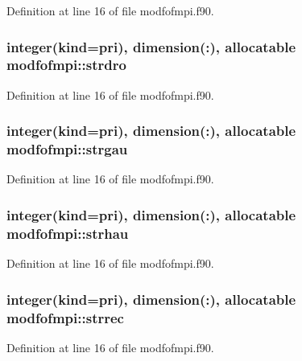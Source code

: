 Definition at line 16 of file modfofmpi.\+f90.

\subsubsection[{\texorpdfstring{strdro}{strdro}}]{\setlength{\rightskip}{0pt plus 5cm}integer(kind=pri), dimension(\+:), allocatable modfofmpi\+::strdro}\hypertarget{namespacemodfofmpi_a6f52fb3f19368ce1dbad562162f6d4b5}{}\label{namespacemodfofmpi_a6f52fb3f19368ce1dbad562162f6d4b5}


Definition at line 16 of file modfofmpi.\+f90.

\subsubsection[{\texorpdfstring{strgau}{strgau}}]{\setlength{\rightskip}{0pt plus 5cm}integer(kind=pri), dimension(\+:), allocatable modfofmpi\+::strgau}\hypertarget{namespacemodfofmpi_a59d3a040e03ea0312701cf16ded04071}{}\label{namespacemodfofmpi_a59d3a040e03ea0312701cf16ded04071}


Definition at line 16 of file modfofmpi.\+f90.

\subsubsection[{\texorpdfstring{strhau}{strhau}}]{\setlength{\rightskip}{0pt plus 5cm}integer(kind=pri), dimension(\+:), allocatable modfofmpi\+::strhau}\hypertarget{namespacemodfofmpi_a9ace6e4f0b23785f3b93fe1812b07c08}{}\label{namespacemodfofmpi_a9ace6e4f0b23785f3b93fe1812b07c08}


Definition at line 16 of file modfofmpi.\+f90.

\subsubsection[{\texorpdfstring{strrec}{strrec}}]{\setlength{\rightskip}{0pt plus 5cm}integer(kind=pri), dimension(\+:), allocatable modfofmpi\+::strrec}\hypertarget{namespacemodfofmpi_ada00af1a25f50e826521e9b2a7ecb633}{}\label{namespacemodfofmpi_ada00af1a25f50e826521e9b2a7ecb633}


Definition at line 16 of file modfofmpi.\+f90.

